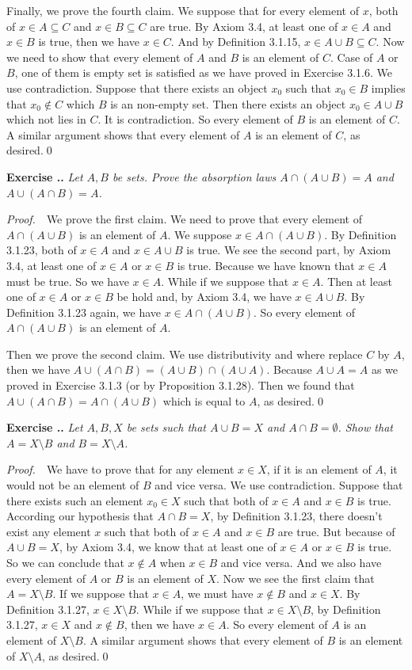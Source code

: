 \documentclass{book}
\newcommand{\pff}{\vspace{.25em}\noindent\emph{Proof.}~~}
\newcounter{Exercise}[section]
\renewcommand{\theExercise}{\thesection.\arabic{Exercise}.}
\newcommand{\new}{\vspace{1.5em}\noindent\textbf{{Exercise \stepcounter{Exercise}\textbf{\theExercise}}} }
\begin{document}
Finally, we prove the fourth claim. We suppose that for every element of $x$, both of $x\in A\subseteq C$ and $x\in B\subseteq C$ are true. By Axiom 3.4, at least one of $x\in A$ and $x\in B$ is true, then we have $x\in C$. And by Definition 3.1.15, $x\in A\cup B\subseteq C$. Now we need to show that every element of $A$ and $B$ is an element of $C$. Case of $A$ or $B$, one of them is empty set is satisfied as we have proved in Exercise 3.1.6. We use contradiction. Suppose that there exists an object $x_0$ such that $x_0\in B$ implies that $x_0\notin C$ which $B$ is an non-empty set. Then there exists an object $x_0\in A\cup B$ which not lies in $C$. It is contradiction. So every element of $B$ is an element of $C$. A similar argument shows that every element of $A$ is an element of $C$, as desired.\qed

\new\emph{Let $A,B$ be sets. Prove the absorption laws $A\cap(A\cup B)=A$ and $A\cup(A\cap B)=A$.}

\pff We prove the first claim. We need to prove that every element of $A\cap(A\cup B)$ is an element of $A$. We suppose $x\in A\cap(A\cup B)$. By Definition 3.1.23, both of $x\in A$ and $x\in A\cup B$ is true. We see the second part, by Axiom 3.4, at least one of $x\in A$ or $x\in B$ is true. Because we have known that $x\in A$ must be true. So we have $x\in A$. While if we suppose that $x\in A$. Then at least one of $x\in A$ or $x\in B$ be hold and, by Axiom 3.4, we have $x\in A\cup B$. By Definition 3.1.23 again, we have $x\in A\cap(A\cup B)$. So every element of $A\cap(A\cup B)$ is an element of $A$.

Then we prove the second claim. We use distributivity and where replace $C$ by $A$, then we have $A\cup(A\cap B)=(A\cup B)\cap(A\cup A)$. Because $A\cup A=A$ as we proved in Exercise 3.1.3 (or by Proposition 3.1.28). Then we found that $A\cup(A\cap B)=A\cap(A\cup B)$ which is equal to $A$, as desired.\qed

\new\emph{Let $A,B,X$ be sets such that $A\cup B=X$ and $A\cap B=\emptyset$. Show that $A=X\setminus B$ and $B=X\setminus A$.}

\pff We have to prove that for any element $x\in X$, if it is an element of $A$, it would not be an element of $B$ and vice versa. We use contradiction. Suppose that there exists such an element $x_0\in X$ such that both of $x\in A$ and $x\in B$ is true. According our hypothesis that $A\cap B=X$, by Definition 3.1.23, there doesn't exist any element $x$ such that both of $x\in A$ and $x\in B$ are true. But because of $A\cup B=X$, by Axiom 3.4, we know that at least one of $x\in A$ or $x\in B$ is true. So we can conclude that $x\notin A$ when $x\in B$ and vice versa. And we also have every element of $A$ or $B$ is an element of $X$. Now we see the first claim that $A=X\setminus B$. If we suppose that $x\in A$, we must have $x\notin B$ and $x\in X$. By Definition 3.1.27, $x\in X\setminus B$. While if we suppose that $x\in X\setminus B$, by Definition 3.1.27, $x\in X$ and $x\notin B$, then we have $x\in A$. So every element of $A$ is an element of $X\setminus B$. A similar argument shows that every element of $B$ is an element of $X\setminus A$, as desired.\qed 
\end{document}
